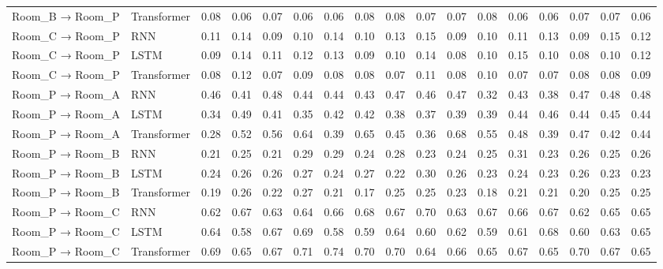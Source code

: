 \begin{tabular}{lllllllllllllllll}
Room_B → Room_P & Transformer & 0.08 & 0.06 & 0.07 & 0.06 & 0.06 & 0.08 & 0.08 & 0.07 & 0.07 & 0.08 & 0.06 & 0.06 & 0.07 & 0.07 & 0.06 \\
Room_C → Room_P & RNN & 0.11 & 0.14 & 0.09 & 0.10 & 0.14 & 0.10 & 0.13 & 0.15 & 0.09 & 0.10 & 0.11 & 0.13 & 0.09 & 0.15 & 0.12 \\
Room_C → Room_P & LSTM & 0.09 & 0.14 & 0.11 & 0.12 & 0.13 & 0.09 & 0.10 & 0.14 & 0.08 & 0.10 & 0.15 & 0.10 & 0.08 & 0.10 & 0.12 \\
Room_C → Room_P & Transformer & 0.08 & 0.12 & 0.07 & 0.09 & 0.08 & 0.08 & 0.07 & 0.11 & 0.08 & 0.10 & 0.07 & 0.07 & 0.08 & 0.08 & 0.09 \\
Room_P → Room_A & RNN & 0.46 & 0.41 & 0.48 & 0.44 & 0.44 & 0.43 & 0.47 & 0.46 & 0.47 & 0.32 & 0.43 & 0.38 & 0.47 & 0.48 & 0.48 \\
Room_P → Room_A & LSTM & 0.34 & 0.49 & 0.41 & 0.35 & 0.42 & 0.42 & 0.38 & 0.37 & 0.39 & 0.39 & 0.44 & 0.46 & 0.44 & 0.45 & 0.44 \\
Room_P → Room_A & Transformer & 0.28 & 0.52 & 0.56 & 0.64 & 0.39 & 0.65 & 0.45 & 0.36 & 0.68 & 0.55 & 0.48 & 0.39 & 0.47 & 0.42 & 0.44 \\
Room_P → Room_B & RNN & 0.21 & 0.25 & 0.21 & 0.29 & 0.29 & 0.24 & 0.28 & 0.23 & 0.24 & 0.25 & 0.31 & 0.23 & 0.26 & 0.25 & 0.26 \\
Room_P → Room_B & LSTM & 0.24 & 0.26 & 0.26 & 0.27 & 0.24 & 0.27 & 0.22 & 0.30 & 0.26 & 0.23 & 0.24 & 0.23 & 0.26 & 0.23 & 0.23 \\
Room_P → Room_B & Transformer & 0.19 & 0.26 & 0.22 & 0.27 & 0.21 & 0.17 & 0.25 & 0.25 & 0.23 & 0.18 & 0.21 & 0.21 & 0.20 & 0.25 & 0.25 \\
Room_P → Room_C & RNN & 0.62 & 0.67 & 0.63 & 0.64 & 0.66 & 0.68 & 0.67 & 0.70 & 0.63 & 0.67 & 0.66 & 0.67 & 0.62 & 0.65 & 0.65 \\
Room_P → Room_C & LSTM & 0.64 & 0.58 & 0.67 & 0.69 & 0.58 & 0.59 & 0.64 & 0.60 & 0.62 & 0.59 & 0.61 & 0.68 & 0.60 & 0.63 & 0.65 \\
Room_P → Room_C & Transformer & 0.69 & 0.65 & 0.67 & 0.71 & 0.74 & 0.70 & 0.70 & 0.64 & 0.66 & 0.65 & 0.67 & 0.65 & 0.70 & 0.67 & 0.65 \\
\bottomrule
\end{tabular}
